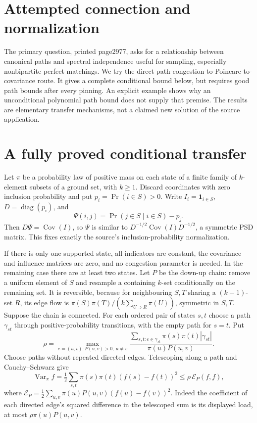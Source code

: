 \documentclass[11pt]{article}
\begin{document}
\section{Attempted connection and normalization}
The primary question, printed page2977, asks for a relationship
between canonical paths and spectral independence useful for
sampling, especially nonbipartite perfect matchings. We try the
direct path-congestion-to-Poincare-to-covariance route. It gives
a complete conditional bound below, but requires good path
bounds after every pinning. An explicit example shows why an
unconditional polynomial path bound does not supply that premise.
The results are elementary transfer mechanisms, not a claimed
new solution of the source application.

\section{A fully proved conditional transfer}
Let $\pi$ be a probability law of positive mass on each state
of a finite family of $k$-element subsets of a ground set, with $k\ge1$.
Discard coordinates with zero inclusion probability and put
$p_i=\Pr(i\in S)>0$. Write $I_i=\boldsymbol{1}_{i\in S}$,
$D=\operatorname{diag}(p_i)$, and
\[
 \Psi(i,j)=\Pr(j\in S\mid i\in S)-p_j.
\]
Then $D\Psi=\operatorname{Cov}(I)$, so $\Psi$ is similar to
$D^{-1/2}\operatorname{Cov}(I)D^{-1/2}$, a symmetric PSD matrix.
This fixes exactly the source's inclusion-probability normalization.

If there is only one supported state, all indicators are constant,
the covariance and influence matrices are zero, and no congestion
parameter is needed. In the remaining case there are at least two
states. Let $P$ be the down-up chain: remove a uniform element of $S$
and resample a containing $k$-set conditionally on the remaining
set. It is reversible, because for neighbouring $S,T$ sharing
a $(k-1)$-set $R$, its edge flow is
$\pi(S)\pi(T)/(k\sum_{U\supset R}\pi(U))$, symmetric in $S,T$.
Suppose the chain is connected. For each ordered pair of states
$s,t$ choose a path $\gamma_{st}$ through positive-probability
transitions, with the empty path for $s=t$. Put
\[
 \rho=\max_{e=(u,v):P(u,v)>0,\ u\ne v}
 \frac{\sum_{s,t:e\in\gamma_{st}}\pi(s)\pi(t)|\gamma_{st}|}
 {\pi(u)P(u,v)}.
\]
Choose paths without repeated directed edges. Telescoping along
a path and Cauchy--Schwarz give
\[
 \operatorname{Var}_\pi f
 =\tfrac12\sum_{s,t}\pi(s)\pi(t)(f(s)-f(t))^2
 \le\rho\,\mathcal E_P(f,f),
\]
where $\mathcal E_P=\tfrac12\sum_{u,v}\pi(u)P(u,v)
(f(u)-f(v))^2$. Indeed the coefficient of each directed edge's
squared difference in the telescoped sum is its displayed
load, at most $\rho\pi(u)P(u,v)$.
\end{document}

